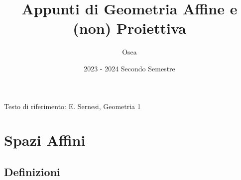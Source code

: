 \documentclass{article}
\title{Appunti di Geometria Affine e (non) Proiettiva}
\author{Osea}
\date{2023 \-- 2024 Secondo Semestre}
\newcommand{\incfig}[2][1]{%
    \def\svgwidth{#1\columnwidth}
    {#2.pdf_tex}
}
\newcounter{theo}[section]\setcounter{theo}{0}
\newcounter{excounter}[section]\setcounter{excounter}{0}
\theoremstyle{plain}
\theoremstyle{definition}
\newtheorem{example}[excounter]{Esempio}
\theoremstyle{remark}
\begin{document}
\maketitle

Testo di riferimento: E. Sernesi,  Geometria 1
\tableofcontents
\section{Spazi Affini}

\subsection{Definizioni}
%     
% 
\end{document}
